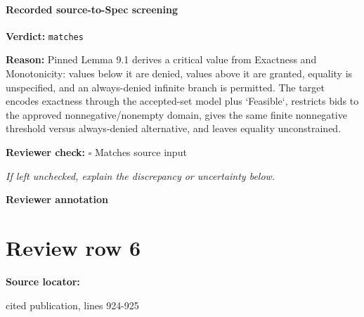 \documentclass[10pt]{article}
\newcommand{\reviewerbox}{%
  \par\noindent\fbox{\parbox{0.96\linewidth}{\rule{0pt}{0.38in}}}\par
}
\newcommand{\reviewmatch}[1]{%
  \par\noindent\textbf{Reviewer check:} $\square$\; #1\par
  \noindent\emph{If left unchecked, explain the discrepancy or uncertainty below.}\par
}
\begin{document}
\paragraph{Recorded source-to-Spec screening}
\textbf{Verdict:} \texttt{matches}
\\
{\raggedright
\textbf{Reason:} Pinned Lemma 9.\allowbreak{}1 derives a critical value from Exactness and Monotonicity:\allowbreak{} values below it are denied, values above it are granted, equality is unspecified, and an always-\allowbreak{}denied infinite branch is permitted.\allowbreak{} The target encodes exactness through the accepted-\allowbreak{}set model plus `Feasible`, restricts bids to the approved nonnegative/\allowbreak{}nonempty domain, gives the same finite nonnegative threshold versus always-\allowbreak{}denied alternative, and leaves equality unconstrained.\allowbreak{}
\par}
\reviewmatch{Matches source input}
\noindent\textbf{Reviewer annotation}\par
\reviewerbox
\clearpage
\hypertarget{source-claim-c213baf0abdcb287}{}
\section*{Review row 6}
\textbf{Source locator:} {\footnotesize\raggedright cited publication, lines 924-\allowbreak{}925\par}
\end{document}
